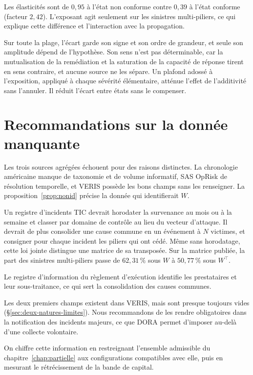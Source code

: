 Les élasticités sont de $0{,}95$ à l'état non conforme contre $0{,}39$ à l'état
conforme (facteur $2{,}42$). L'exposant agit seulement sur les sinistres multi-piliers,
ce qui explique cette différence et l'interaction avec la propagation.

Sur toute la plage, l'écart garde son signe et son ordre de grandeur, et seule son amplitude dépend
de l'hypothèse. Son sens n'est pas déterminable, car la mutualisation de la remédiation et la
saturation de la capacité de réponse tirent en sens contraire, et aucune source ne les sépare.
Un plafond adossé à l'exposition, appliqué à chaque sévérité élémentaire, atténue l'effet de l'additivité sans l'annuler.
Il réduit l'écart entre états sans le compenser.


\section{Recommandations sur la donnée manquante}
\label{ch:livrable}

Les trois sources agrégées échouent pour des raisons distinctes. La chronologie américaine manque de
taxonomie et de volume informatif, SAS OpRisk de résolution temporelle, et VERIS possède les bons
champs sans les renseigner. La proposition~\ref{prop:nonid} précise la donnée qui identifierait $W$.

Un registre d'incidents TIC devrait horodater la survenance au mois ou à la semaine et classer par
domaine de contrôle au lieu du vecteur d'attaque. Il devrait de plus consolider une cause commune en
un événement à $N$ victimes, et consigner pour chaque incident les piliers qui ont cédé. Même sans
horodatage, cette loi jointe distingue une matrice de sa transposée. Sur la matrice publiée, la part
des sinistres multi-piliers passe de $62{,}31\,\%$ sous $W$ à $50{,}77\,\%$ sous $W^\top$.

Le registre d'information du règlement d'exécution \citep{eu2024_2956} identifie les prestataires et
leur sous-traitance, ce qui sert la consolidation des causes communes.

Les deux premiers champs existent dans VERIS, mais sont presque toujours vides (\S\ref{sec:deux-natures-limites}).
Nous recommandons de les rendre obligatoires dans la notification des incidents majeurs,
ce que DORA permet d'imposer au-delà d'une collecte volontaire.

On chiffre cette information en restreignant l'ensemble admissible du chapitre~\ref{chap:partielle}
aux configurations compatibles avec elle, puis en mesurant le rétrécissement de la bande de capital.

